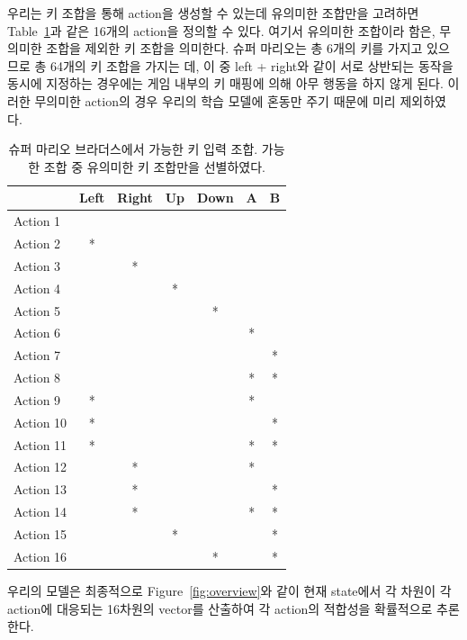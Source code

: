 우리는 키 조합을 통해 action을 생성할 수 있는데 유의미한 조합만을 고려하면 Table~\ref{tab:mario:action}과 같은 16개의 action을 정의할 수 있다.
여기서 유의미한 조합이라 함은, 무의미한 조합을 제외한 키 조합을 의미한다.
슈퍼 마리오는 총 6개의 키를 가지고 있으므로 총 64개의 키 조합을 가지는 데, 이 중 left + right와 같이 서로 상반되는 동작을 동시에 지정하는 경우에는 게임 내부의 키 매핑에 의해 아무 행동을 하지 않게 된다.
이러한 무의미한 action의 경우 우리의 학습 모델에 혼동만 주기 때문에 미리 제외하였다.
%
\begin{table}[h]
	\caption {
		슈퍼 마리오 브라더스에서 가능한 키 입력 조합. 가능한 조합 중 유의미한 키 조합만을 선별하였다.
	}
	\label{tab:mario:action}
\centering	
\begin{tabular}{lcccccc}
\toprule
          & Left & Right & Up & Down & A & B \\
\midrule
Action 1  &      &       &    &      &   &   \\
Action 2  & *    &       &    &      &   &   \\
Action 3  &      & *     &    &      &   &   \\
Action 4  &      &       & *  &      &   &   \\
Action 5  &      &       &    & *    &   &   \\
Action 6  &      &       &    &      & * &   \\
Action 7  &      &       &    &      &   & * \\
Action 8  &      &       &    &      & * & * \\
Action 9  & *    &       &    &      & * &   \\
Action 10 & *    &       &    &      &   & * \\
Action 11 & *    &       &    &      & * & * \\
Action 12 &      & *     &    &      & * &   \\
Action 13 &      & *     &    &      &   & * \\
Action 14 &      & *     &    &      & * & * \\
Action 15 &      &       & *  &      &   & * \\
Action 16 &      &       &    & *    &   & * \\
\bottomrule
\end{tabular}
\end{table}
%
우리의 모델은 최종적으로 Figure~\ref{fig:overview}와 같이 현재 state에서 각 차원이 각 action에 대응되는 16차원의 vector를 산출하여 각 action의 적합성을 확률적으로 추론한다.
